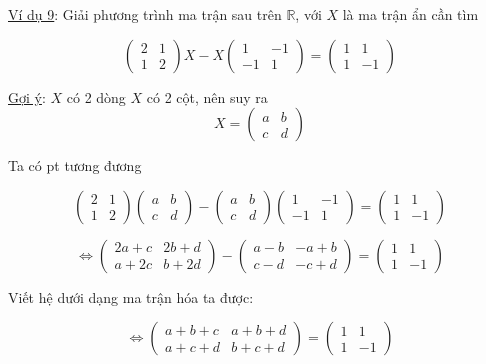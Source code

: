 \documentclass[
]{article}
\let\ul\uline
\begin{document}
\ul{Ví dụ 9}: Giải phương trình ma trận sau trên
$\mathbb{R}$, với
$X$ là ma trận ẩn
cần tìm

$$\begin{pmatrix} 2 & 1 \\ 1 & 2 \end{pmatrix} X - X \begin{pmatrix} 1 & -1 \\ -1 & 1 \end{pmatrix} = \begin{pmatrix} 1 & 1 \\ 1 & -1 \end{pmatrix}$$

\ul{Gợi ý}: $X$ có
2 dòng $X$ có 2
cột, nên suy ra
$$X = \begin{pmatrix} a & b \\ c & d \end{pmatrix}$$

Ta có pt tương đương

$$\begin{pmatrix} 2 & 1 \\ 1 & 2 \end{pmatrix} \begin{pmatrix} a & b \\ c & d \end{pmatrix} - \begin{pmatrix} a & b \\ c & d \end{pmatrix} \begin{pmatrix} 1 & -1 \\ -1 & 1 \end{pmatrix} = \begin{pmatrix} 1 & 1 \\ 1 & -1 \end{pmatrix}$$

$$\Leftrightarrow \begin{pmatrix} 2a+c & 2b+d \\ a+2c & b+2d \end{pmatrix} - \begin{pmatrix} a-b & -a+b \\ c-d & -c+d \end{pmatrix} = \begin{pmatrix} 1 & 1 \\ 1 & -1 \end{pmatrix}$$

Viết hệ dưới dạng ma trận hóa ta được:

$$\Leftrightarrow \begin{pmatrix} a+b+c & a+b+d \\ a+c+d & b+c+d \end{pmatrix} = \begin{pmatrix} 1 & 1 \\ 1 & -1 \end{pmatrix}$$
\end{document}
